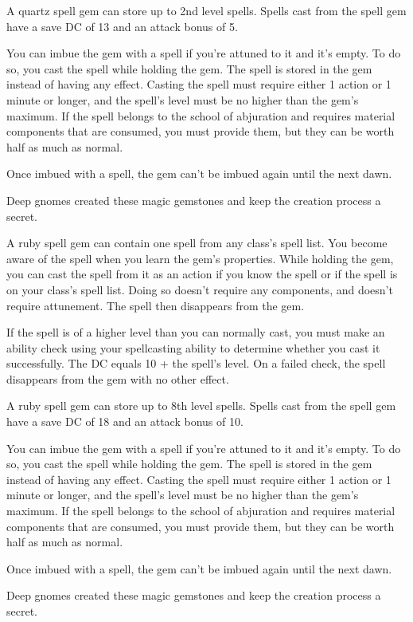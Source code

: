 \documentclass[10pt,a4paper,twoside,bg=print,twocolumn,openany,nodeprecatedcode]{dndbook}
\begin{document}
A quartz spell gem can store up to 2nd level spells. Spells cast from the spell gem have a save DC of 13 and an attack bonus of 5.

You can imbue the gem with a spell if you're attuned to it and it's empty. To do so, you cast the spell while holding the gem. The spell is stored in the gem instead of having any effect. Casting the spell must require either 1 action or 1 minute or longer, and the spell's level must be no higher than the gem's maximum. If the spell belongs to the school of abjuration and requires material components that are consumed, you must provide them, but they can be worth half as much as normal.

Once imbued with a spell, the gem can't be imbued again until the next dawn.

Deep gnomes created these magic gemstones and keep the creation process a secret.

A ruby spell gem can contain one spell from any class's spell list. You become aware of the spell when you learn the gem's properties. While holding the gem, you can cast the spell from it as an action if you know the spell or if the spell is on your class's spell list. Doing so doesn't require any components, and doesn't require attunement. The spell then disappears from the gem.

If the spell is of a higher level than you can normally cast, you must make an ability check using your spellcasting ability to determine whether you cast it successfully. The DC equals 10 + the spell's level. On a failed check, the spell disappears from the gem with no other effect.

A ruby spell gem can store up to 8th level spells. Spells cast from the spell gem have a save DC of 18 and an attack bonus of 10.

You can imbue the gem with a spell if you're attuned to it and it's empty. To do so, you cast the spell while holding the gem. The spell is stored in the gem instead of having any effect. Casting the spell must require either 1 action or 1 minute or longer, and the spell's level must be no higher than the gem's maximum. If the spell belongs to the school of abjuration and requires material components that are consumed, you must provide them, but they can be worth half as much as normal.

Once imbued with a spell, the gem can't be imbued again until the next dawn.

Deep gnomes created these magic gemstones and keep the creation process a secret.
\end{document}
